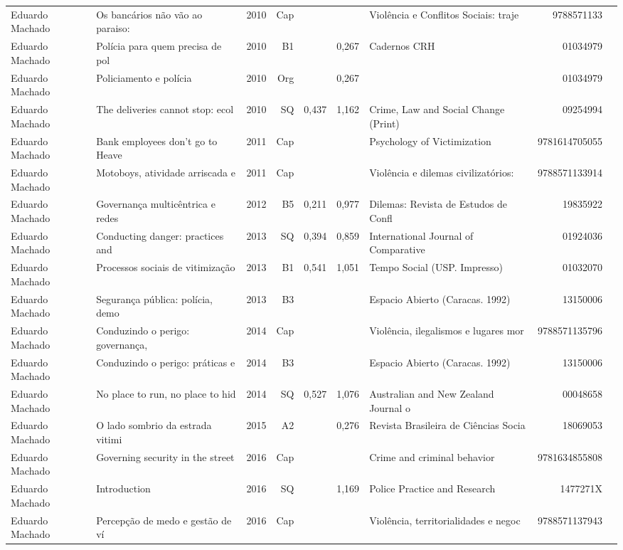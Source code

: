 \documentclass[12pt,brazil]{article}\usepackage[]{graphicx}\usepackage[]{xcolor}
\begin{document}
\begin{longtable}{lllrrllrr}
Eduardo Machado & Os bancários não vão ao paraiso: & 2010 & Cap &  &  & Violência e Conflitos Sociais: traje & 9788571133 \\
Eduardo Machado & Polícia para quem precisa de pol & 2010 & B1 &  & 0,267 & Cadernos CRH & 01034979 \\
Eduardo Machado & Policiamento e polícia & 2010 & Org &  & 0,267 &  & 01034979 \\
Eduardo Machado & The deliveries cannot stop: ecol & 2010 & SQ & 0,437 & 1,162 & Crime, Law and Social Change (Print) & 09254994 \\
Eduardo Machado & Bank employees don’t go to Heave & 2011 & Cap &  &  & Psychology of Victimization & 9781614705055 \\
Eduardo Machado & Motoboys, atividade arriscada e  & 2011 & Cap &  &  & Violência e dilemas civilizatórios:  & 9788571133914 \\
Eduardo Machado & Governança multicêntrica e redes & 2012 & B5 & 0,211 & 0,977 & Dilemas: Revista de Estudos de Confl & 19835922 \\
Eduardo Machado & Conducting danger: practices and & 2013 & SQ & 0,394 & 0,859 & International Journal of Comparative & 01924036 \\
Eduardo Machado & Processos sociais de vitimização & 2013 & B1 & 0,541 & 1,051 & Tempo Social (USP. Impresso) & 01032070 \\
Eduardo Machado & Segurança pública: polícia, demo & 2013 & B3 &  &  & Espacio Abierto (Caracas. 1992) & 13150006 \\
Eduardo Machado & Conduzindo o perigo: governança, & 2014 & Cap &  &  & Violência, ilegalismos e lugares mor & 9788571135796 \\
Eduardo Machado & Conduzindo o perigo: práticas e  & 2014 & B3 &  &  & Espacio Abierto (Caracas. 1992) & 13150006 \\
Eduardo Machado & No place to run, no place to hid & 2014 & SQ & 0,527 & 1,076 & Australian and New Zealand Journal o & 00048658 \\
Eduardo Machado & O lado sombrio da estrada vitimi & 2015 & A2 &  & 0,276 & Revista Brasileira de Ciências Socia & 18069053 \\
Eduardo Machado & Governing security in the street & 2016 & Cap &  &  & Crime and criminal behavior & 9781634855808 \\
Eduardo Machado & Introduction & 2016 & SQ &  & 1,169 & Police Practice and Research & 1477271X \\
Eduardo Machado & Percepção de medo e gestão de ví & 2016 & Cap &  &  & Violência, territorialidades e negoc & 9788571137943 \\

\end{longtable}
\end{document}
